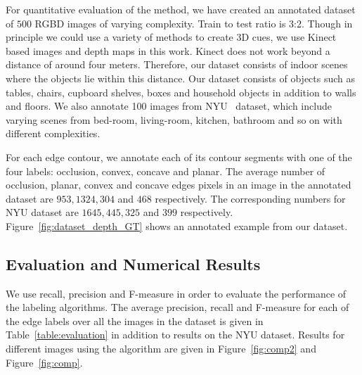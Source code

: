 For quantitative evaluation of the method, we have created an annotated dataset of $500$ RGBD images
of varying complexity. Train to test ratio is 3:2. Though in principle we could use a variety of methods 
to create 3D cues, we use Kinect based images and depth maps in this work. Kinect does not work beyond a 
distance of around four meters. Therefore, our dataset consists of indoor scenes where the objects lie within 
this distance. Our dataset consists of objects such as tables, chairs, cupboard shelves, boxes and household 
objects in addition to walls and floors. We also annotate 100 images from NYU~\cite{Silberman:ECCV12} dataset, 
which include varying scenes from bed-room, living-room, kitchen, bathroom and so on with different complexities. 

For each edge contour, we annotate each of its contour segments with one of the four labels: occlusion, 
convex, concave and planar. The average number of occlusion, planar, convex and concave edges pixels in 
an image in the annotated dataset are $953, 1324, 304$ and $468$ respectively. The corresponding numbers 
for NYU dataset are $1645, 445, 325$ and $399$ respectively. Figure~\ref{fig:dataset_depth_GT} shows an 
annotated example from our dataset. 

\subsection{Evaluation and Numerical Results}

We use recall, precision and F-measure in order to evaluate the performance of the labeling algorithms. 
The average precision, recall and F-measure for each of the edge labels over all the images in the dataset 
is given in Table~\ref{table:evaluation} in addition to results on the NYU dataset. Results for different 
images using the algorithm are given in Figure~\ref{fig:comp2} and Figure~\ref{fig:comp}.

